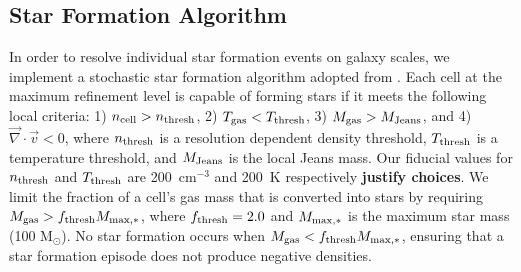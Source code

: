 \documentclass[twocolumn]{aastex61}
\begin{document}
\subsection{Star Formation Algorithm}
\label{sec:star formation}
In order to resolve individual star formation events on galaxy scales, we implement a stochastic star formation algorithm adopted from \citet{Goldbaum2015,Goldbaum2016}. Each cell at the maximum refinement level is capable of forming stars if it meets the following local criteria: 1) $n_{\rm cell} > n_{\rm thresh}$, 2) $T_{\rm gas} < T_{\rm thresh}$, 3) $M_{\rm gas} > M_{\rm Jeans}$, and 4) $\vec{\nabla} \cdot \vec{v} < 0$, where $n_{\rm thresh}$ is a resolution dependent density threshold, $T_{\rm thresh}$ is a temperature threshold, and $M_{\rm Jeans}$ is the local Jeans mass. Our fiducial values for $n_{\rm thresh}$ and $T_{\rm thresh}$ are 200~cm$^{-3}$ and 200~K respectively \textbf{justify choices}. We limit the fraction of a cell's gas mass that is converted into stars by requiring $M_{\rm gas} > f_{\rm thresh} M_{\rm max,*}$, where $f_{\rm thresh} = 2.0 $ and $M_{\rm max,*}$ is the maximum star mass (100 M$_{\odot}$). No star formation occurs when $M_{\rm gas} < f_{\rm thresh} M_{\rm max,*}$, ensuring that a star formation episode does not produce negative densities.
\end{document}
